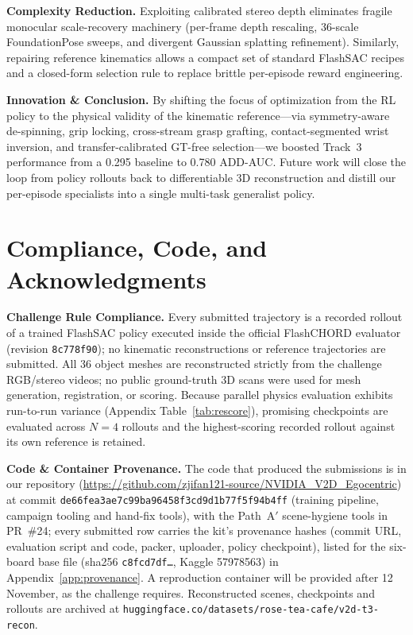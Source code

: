 \documentclass[10pt]{nvidiaextabstract}
\begin{document}
\textbf{Complexity Reduction.} Exploiting calibrated stereo depth eliminates fragile monocular scale-recovery machinery (per-frame depth rescaling, 36-scale FoundationPose sweeps, and divergent Gaussian splatting refinement). Similarly, repairing reference kinematics allows a compact set of standard FlashSAC recipes and a closed-form selection rule to replace brittle per-episode reward engineering.

\textbf{Innovation \& Conclusion.} By shifting the focus of optimization from the RL policy to the physical validity of the kinematic reference—via symmetry-aware de-spinning, grip locking, cross-stream grasp grafting, contact-segmented wrist inversion, and transfer-calibrated GT-free selection—we boosted Track~3 performance from a 0.295 baseline to 0.780 ADD-AUC. Future work will close the loop from policy rollouts back to differentiable 3D reconstruction and distill our per-episode specialists into a single multi-task generalist policy.

\clearpage

\section*{Compliance, Code, and Acknowledgments}
\label{sec:compliance}
\textbf{Challenge Rule Compliance.} Every submitted trajectory is a recorded rollout of a trained FlashSAC policy executed inside the official FlashCHORD evaluator (revision \texttt{8c778f90}); no kinematic reconstructions or reference trajectories are submitted. All 36 object meshes are reconstructed strictly from the challenge RGB/stereo videos; no public ground-truth 3D scans were used for mesh generation, registration, or scoring. Because parallel physics evaluation exhibits run-to-run variance (Appendix Table~\ref{tab:rescore}), promising checkpoints are evaluated across $N=4$ rollouts and the highest-scoring recorded rollout against its own reference is retained.

\textbf{Code \& Container Provenance.} The code that produced the submissions is in our repository (\url{https://github.com/zjifan121-source/NVIDIA_V2D_Egocentric}) at commit \texttt{de66fea3ae7c99ba96458f3cd9d1b77f5f94b4ff} (training pipeline, campaign tooling and hand-fix tools), with the Path~A$'$ scene-hygiene tools in PR~\#24; every submitted row carries the kit's provenance hashes (commit URL, evaluation script and code, packer, uploader, policy checkpoint), listed for the six-board base file (sha256 \texttt{c8fcd7df\ldots}, Kaggle 57978563) in Appendix~\ref{app:provenance}. A reproduction container will be provided after 12 November, as the challenge requires. Reconstructed scenes, checkpoints and rollouts are archived at \texttt{huggingface.co/datasets/rose-tea-cafe/v2d-t3-recon}.
\end{document}
